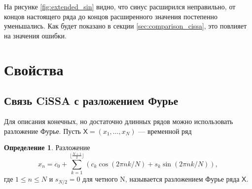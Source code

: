 \documentclass[12pt, specialist, subf
]{disser}
\theoremstyle{definition}
\newcommand{\SSA}{\texttt{SSA}}
\newcommand{\CISSA}{\texttt{CiSSA}}
\newcommand{\TS}{\mathsf{X}}
\newtheorem{definition}{Определение} %
\newtheorem{theorem}{Теорема} %
\begin{document}
На рисунке \ref{fig:extended_sin} видно, что синус расширился неправильно, от концов настоящего ряда до концов расширенного значения постепенно уменьшались. Как будет показано в секции \ref{sec:comparison_cissa}, это повлияет на значения ошибки.




\section{Свойства}

%
%
%
%
%

\subsection{Связь CiSSA с разложением Фурье}
\label{subsec:cissa_fourier}
Для описания конечных, но достаточно длинных рядов можно использовать разложение Фурье. Пусть $\TS = (x_1, \dots, x_N)$ — временной ряд
\begin{definition}
	Разложение
	\begin{equation}
		\label{eq:fourier}
		x_n = c_0 + \sum\limits_{k = 1}^{\lfloor \frac{N+1}{2} \rfloor}\left(c_k \cos(2\pi n k / N) + s_k \sin(2\pi n k / N) \right),
	\end{equation}
	где $1 \leq n \leq N$ и $s_{N/2} = 0 $ для четного N, называется разложением Фурье ряда $\TS$.
\end{definition}
\end{document}
